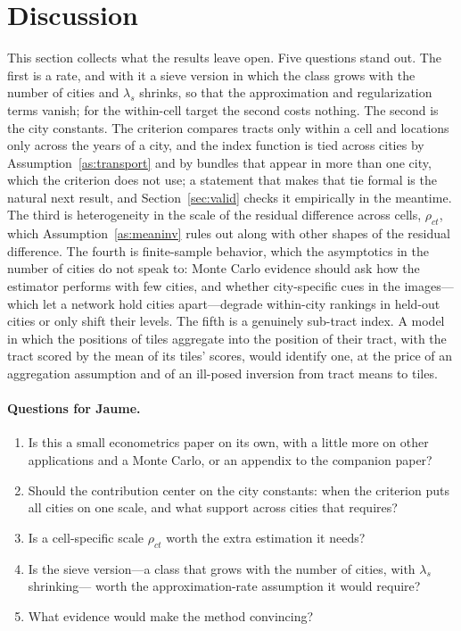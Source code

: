\documentclass[11pt]{article}
\theoremstyle{remark}
\begin{document}
\section{Discussion}\label{sec:disc}

This section collects what the results leave open. Five questions stand out. The first is a rate, and with it a sieve version in which the class grows
with the number of cities and $\lambda_{s}$ shrinks, so that the approximation and regularization terms
vanish; for the within-cell target the second costs nothing. The second is the city constants. The
criterion compares tracts only within a cell and locations only across the years of a city, and the
index function is tied across cities by Assumption~\ref{as:transport} and by bundles that appear in more
than one city, which the criterion does not use; a statement that makes that tie formal is the natural next result, and
Section~\ref{sec:valid} checks it empirically in the meantime. The third is heterogeneity in the scale
of the residual difference across cells, $\rho_{ct}$, which Assumption~\ref{as:meaninv} rules out along with other shapes of the residual difference. The
fourth is finite-sample behavior, which the asymptotics in the number of cities do not speak to: Monte
Carlo evidence should ask how the estimator performs with few cities, and whether city-specific cues in
the images---which let a network hold cities apart---degrade within-city rankings in held-out cities or
only shift their levels. The fifth is a genuinely sub-tract index. A model in which the positions of
tiles aggregate into the position of their tract, with the tract scored by the mean of its tiles'
scores, would identify one, at the price of an aggregation assumption and of an ill-posed inversion from
tract means to tiles.

\paragraph{Questions for Jaume.}
\begin{enumerate}
\item Is this a small econometrics paper on its own, with a little more on other applications and a
Monte Carlo, or an appendix to the companion paper?
\item Should the contribution center on the city constants: when the criterion puts all cities on one
scale, and what support across cities that requires?
\item Is a cell-specific scale $\rho_{ct}$ worth the extra estimation it needs?
\item Is the sieve version---a class that grows with the number of cities, with $\lambda_{s}$ shrinking---
worth the approximation-rate assumption it would require?
\item What evidence would make the method convincing?
\end{enumerate}
\end{document}
